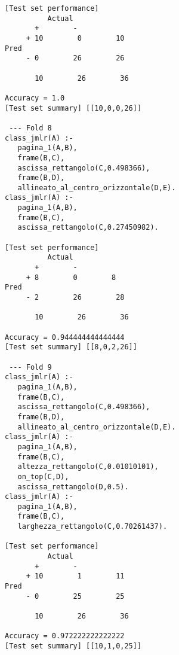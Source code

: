 \begin{multicols}{2}
\begin{verbatim}
[Test set performance]
          Actual
       +        - 
     + 10        0        10 
Pred 
     - 0        26        26 

       10        26        36 

Accuracy = 1.0
[Test set summary] [[10,0,0,26]]

 --- Fold 8
class_jmlr(A) :-
   pagina_1(A,B),
   frame(B,C),
   ascissa_rettangolo(C,0.498366),
   frame(B,D),
   allineato_al_centro_orizzontale(D,E).
class_jmlr(A) :-
   pagina_1(A,B),
   frame(B,C),
   ascissa_rettangolo(C,0.27450982).

[Test set performance]
          Actual
       +        - 
     + 8        0        8 
Pred 
     - 2        26        28 

       10        26        36 

Accuracy = 0.944444444444444
[Test set summary] [[8,0,2,26]]

 --- Fold 9
class_jmlr(A) :-
   pagina_1(A,B),
   frame(B,C),
   ascissa_rettangolo(C,0.498366),
   frame(B,D),
   allineato_al_centro_orizzontale(D,E).
class_jmlr(A) :-
   pagina_1(A,B),
   frame(B,C),
   altezza_rettangolo(C,0.01010101),
   on_top(C,D),
   ascissa_rettangolo(D,0.5).
class_jmlr(A) :-
   pagina_1(A,B),
   frame(B,C),
   larghezza_rettangolo(C,0.70261437).

[Test set performance]
          Actual
       +        - 
     + 10        1        11 
Pred 
     - 0        25        25 

       10        26        36 

Accuracy = 0.972222222222222
[Test set summary] [[10,1,0,25]]
\end{verbatim}
\end{multicols}

